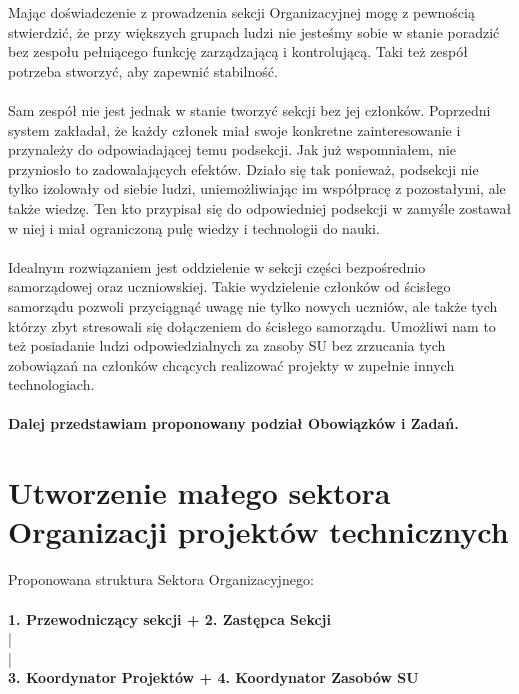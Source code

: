 \documentclass[9pt,a4paper]{report}
\begin{document}
Mając doświadczenie z prowadzenia sekcji Organizacyjnej mogę z pewnością stwierdzić, że przy większych grupach ludzi nie jesteśmy sobie w stanie poradzić bez zespołu pełniącego funkcję zarządzającą i kontrolującą. Taki też zespół potrzeba stworzyć, aby zapewnić stabilność.\\\\ 

Sam zespół nie jest jednak w stanie tworzyć sekcji bez jej członków. Poprzedni system zakładał, że każdy członek miał swoje konkretne zainteresowanie i przynależy do odpowiadającej temu podsekcji. Jak już wspomniałem, nie przyniosło to zadowalających efektów. Działo się tak ponieważ, podsekcji nie tylko izolowały od siebie ludzi, uniemożliwiając im współpracę z pozostałymi, ale także wiedzę. Ten kto przypisał się do odpowiedniej podsekcji w zamyśle zostawał w niej i miał ograniczoną pulę wiedzy i technologii do nauki.\\\\ 

Idealnym rozwiązaniem jest oddzielenie w sekcji części bezpośrednio samorządowej oraz uczniowskiej. Takie wydzielenie członków od ścisłego samorządu pozwoli przyciągnąć uwagę nie tylko nowych uczniów, ale także tych którzy zbyt stresowali się dołączeniem do ścisłego samorządu. Umożliwi nam to też posiadanie ludzi odpowiedzialnych za zasoby SU bez zrzucania tych zobowiązań na członków chcących realizować projekty w zupełnie innych technologiach.\\\\ 

\textbf{Dalej przedstawiam proponowany podział Obowiązków i Zadań.} 

 

\section{Utworzenie małego sektora Organizacji projektów technicznych} 

Proponowana struktura Sektora Organizacyjnego:\\\\ 

\textbf{1. Przewodniczący sekcji + 2. Zastępca Sekcji}\\ 

|\\ 

|\\ 

\textbf{3. Koordynator Projektów + 4. Koordynator Zasobów SU}\\ 
\end{document}
